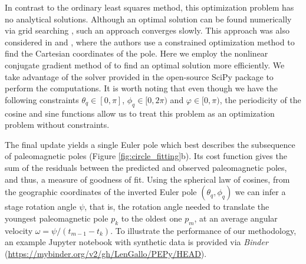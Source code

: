 \documentclass{article} %
\begin{document}
In contrast to the ordinary least squares method, this optimization problem has no analytical solutions. Although an optimal solution can be found numerically via grid searching \citep[e.g.][]{gordon1984paleomagnetic}, such an approach converges slowly.  This approach was also considered in \cite{gray1980} and \cite{fujiki2009}, where the authors use a constrained optimization method to find the Cartesian coordinates of the pole. 
Here we employ the nonlinear conjugate gradient method of \citet{polak1969note} to find an optimal solution more efficiently. %
We take advantage of the solver provided in the open-source SciPy package \citep{virtanen2020scipy} to perform the computations. 
It is worth noting that even though we have the following constraints $\theta_{q} \in [0, \pi]$, $\phi_{q} \in [0, 2\pi )$ and $\varphi \in [0, \pi)$, the periodicity of the cosine and sine functions allow us to treat this problem as an optimization problem without constraints.

The final update yields a single Euler pole which best describes the subsequence of paleomagnetic poles (Figure \ref{fig:circle_fitting}b). Its cost function gives the sum of the residuals between the predicted and observed paleomagnetic poles, and thus, a measure of goodness of fit. Using the spherical law of cosines, from the geographic coordinates of the inverted Euler pole $(\theta_q, \phi_q)$ we can infer a stage rotation angle $\psi$, that is, the rotation angle needed to translate the youngest paleomagnetic pole $p_k$ to the oldest one $p_{m}$, at an average angular velocity $\omega = \psi / (t_{m-1} - t_k)$. To illustrate the performance of our methodology, an example Jupyter notebook with synthetic data is provided  via \textit{Binder} (\url{https://mybinder.org/v2/gh/LenGallo/PEPy/HEAD}).
\end{document}
